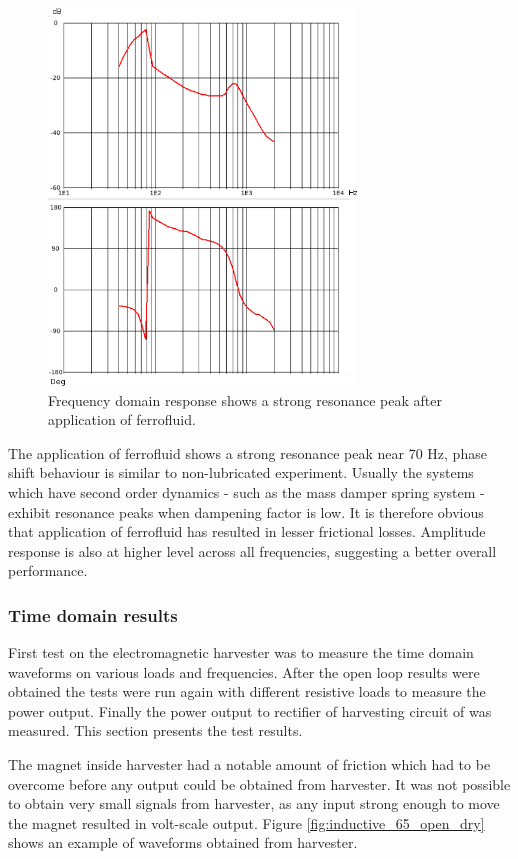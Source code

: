 \begin{figure}[htb]
\begin{center}
\includegraphics[height=10cm]{images/own_measurement/generator_shaker/inductive_bode_ferro.png}
\end{center}
\caption{\label{fig:inductive_bode_ferro} Frequency domain response shows a strong resonance peak after application of ferrofluid.}
\end{figure}

The application of ferrofluid shows a strong resonance peak near 70 Hz, phase shift behaviour is similar to non-lubricated experiment. Usually the systems which have second order dynamics - such as the mass damper spring system - exhibit resonance peaks when dampening factor is low. It is therefore obvious that application of ferrofluid has resulted in lesser frictional losses. Amplitude response is also at higher level across all frequencies, suggesting a better overall performance. 

\subsubsection{Time domain results}\label{sect:lg_td}
First test on the electromagnetic harvester was to measure the time domain waveforms on various loads and frequencies. After the open loop results were obtained the tests were run again with different resistive loads to measure the power output. Finally the power output to rectifier of harvesting circuit of was measured. This section presents the test results. 

The magnet inside harvester had a notable amount of friction which had to be overcome before any output could be obtained from harvester. It was not possible to obtain very small signals from harvester, as any input strong enough to move the magnet resulted in volt-scale output. Figure \ref{fig:inductive_65_open_dry} shows an example of waveforms obtained from harvester. 

